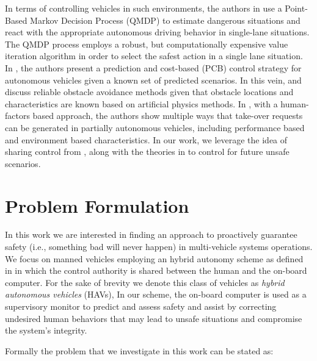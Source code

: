 \documentclass[letterpaper, 10 pt, conference]{ieeeconf}  %
\begin{document}
In terms of controlling vehicles in such environments, the authors in \cite{qmdp} use a Point-Based Markov Decision Process (QMDP) to estimate dangerous situations and react with the appropriate autonomous driving behavior in single-lane situations. The QMDP process employs a robust, but computationally expensive value iteration algorithm in order to select the safest action in a single lane situation. In \cite{predcost}, the authors present a prediction and cost-based (PCB) control strategy for autonomous vehicles given a known set of predicted scenarios. In this vein, \cite{vfh+} and \cite{vfh*} discuss reliable obstacle avoidance methods given that obstacle locations and characteristics are known based on artificial physics methods. In \cite{takeover}, with a human-factors based approach, the authors show multiple ways that take-over requests can be generated in partially autonomous vehicles, including performance based and environment based characteristics. In our work, we leverage the idea of sharing control from \cite{takeover}, along with the theories in \cite{vfh*} to control for future unsafe scenarios.

    
\section{Problem Formulation} \label{sec:probform}
 
In this work we are interested in finding an approach to proactively guarantee safety (i.e., something bad will never happen) in multi-vehicle systems operations. We focus on manned vehicles employing an hybrid autonomy scheme as defined in \cite{corke} in which the control authority is shared between the human and the on-board computer. For the sake of brevity we denote this class of vehicles as {\em hybrid autonomous vehicles} (HAVs), In our scheme, the on-board computer is used as a supervisory monitor to predict and assess safety and assist by correcting undesired human behaviors that may lead to unsafe situations and compromise the system's integrity. 

Formally the problem that we investigate in this work can be stated as: 
\end{document}
